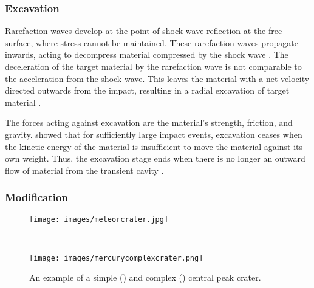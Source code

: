 \subsubsection{Excavation}

\begin{sloppypar} %

Rarefaction waves develop at the point of shock wave reflection at the free-surface, where stress cannot be maintained. These rarefaction waves propagate inwards, acting to decompress material compressed by the shock wave \citep{collins2012impact}. The deceleration of the target material by the rarefaction wave is not comparable to the acceleration from the shock wave. This leaves the material with a net velocity directed outwards from the impact, resulting in a radial excavation of target material \citep{melosh1985impact}.\bigskip

\end{sloppypar}

The forces acting against excavation are the material's strength, friction, and gravity. \citet{nolan1996impact} showed that for sufficiently large impact events, excavation ceases when the kinetic energy of the material is insufficient to move the material against its own weight. Thus, the excavation stage ends when there is no longer an outward flow of material from the transient cavity \citep{collins2002numerical,osinski2012impact}. 

\subsubsection{Modification}


\begin{figure}[!t]
\centering
\begin{minipage}{\linewidth}
\centering
\texttt{[image: images/meteorcrater.jpg]}
\vspace{0.3cm}
\end{minipage}\\
\begin{minipage}{\linewidth}
\centering
\texttt{[image: images/mercurycomplexcrater.png]}
\end{minipage}
\caption{An example of a simple (\protect{}) and complex (\protect{}) central peak crater. \label{fig:simplecomplex}}
\end{figure}

